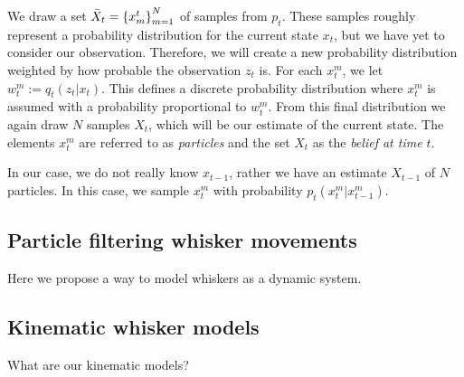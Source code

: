 We draw a set $\bar{X}_t = \left\{x_{m}^{t}\right\}_{m=1}^{N}$ of samples from $p_t$. These samples roughly represent a probability distribution for the current state $x_t$, but we have yet to consider our observation. Therefore, we will create a new probability distribution weighted by how probable the observation $z_t$ is. For each $x_t^m$, we let $w_t^m := q_t\left(z_t | x_t\right)$. This defines a discrete probability distribution where $x_t^m$ is assumed with a probability proportional to $w_t^m$. From this final distribution we again draw $N$ samples $X_t$, which will be our estimate of the current state. The elements $x_t^m$ are referred to as \emph{particles} and the set $X_t$ as the \emph{belief at time $t$}.

In our case, we do not really know $x_{t-1}$, rather we have an estimate $X_{t-1}$ of $N$ particles. In this case, we sample $x_t^m$ with probability $p_t\left(x_t^m | x_{t-1}^m\right)$.

\subsection{Particle filtering whisker movements}
Here we propose a way to model whiskers as a dynamic system.

\subsection{Kinematic whisker models}
What are our kinematic models?
